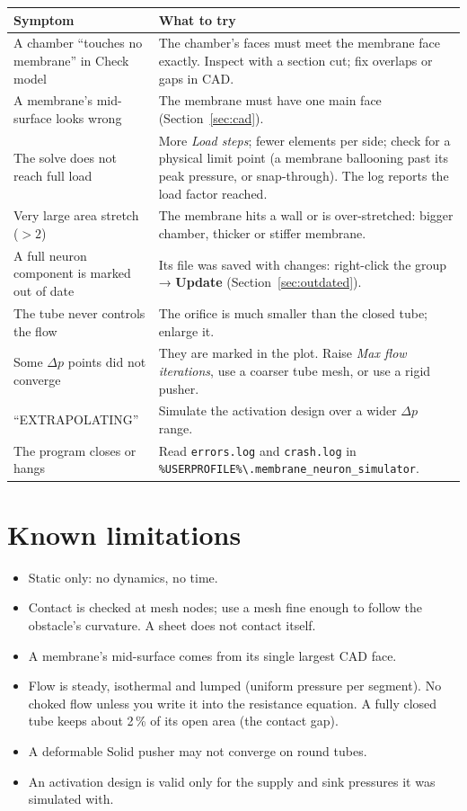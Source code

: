 \documentclass[11pt,a4paper]{article}
\newcommand{\code}[1]{\texttt{#1}}
\newcommand{\menu}[1]{\textsf{\textbf{#1}}}
\begin{document}
\begin{center}
\begin{tabularx}{\textwidth}{@{}>{\raggedright}p{} X@{}}
\toprule
Symptom & What to try \\
\midrule
A chamber ``touches no membrane'' in Check model & The chamber's faces must meet the membrane face exactly.
  Inspect with a section cut; fix overlaps or gaps in CAD. \\
A membrane's mid-surface looks wrong & The membrane must have one main face (Section~\ref{sec:cad}). \\
The solve does not reach full load & More \emph{Load steps}; fewer elements per side; check for a physical limit
  point (a membrane ballooning past its peak pressure, or snap-through). The log reports the load factor reached. \\
Very large area stretch ($>2$) & The membrane hits a wall or is over-stretched: bigger chamber, thicker or stiffer
  membrane. \\
A full neuron component is marked out of date & Its file was saved with changes: right-click the group →
  \menu{Update} (Section~\ref{sec:outdated}). \\
The tube never controls the flow & The orifice is much smaller than the closed tube; enlarge it. \\
Some $\Delta p$ points did not converge & They are marked in the plot. Raise \emph{Max flow iterations}, use a
  coarser tube mesh, or use a rigid pusher. \\
``EXTRAPOLATING'' & Simulate the activation design over a wider $\Delta p$ range. \\
The program closes or hangs & Read \code{errors.log} and \code{crash.log} in
  \code{\%USERPROFILE\%\textbackslash.membrane\_neuron\_simulator}. \\
\bottomrule
\end{tabularx}
\end{center}

\section{Known limitations}

\begin{itemize}
\item Static only: no dynamics, no time.
\item Contact is checked at mesh nodes; use a mesh fine enough to follow the obstacle's curvature. A sheet does not
  contact itself.
\item A membrane's mid-surface comes from its single largest CAD face.
\item Flow is steady, isothermal and lumped (uniform pressure per segment). No choked flow unless you write it into
  the resistance equation. A fully closed tube keeps about 2\,\% of its open area (the contact gap).
\item A deformable Solid pusher may not converge on round tubes.
\item An activation design is valid only for the supply and sink pressures it was simulated with.
\end{itemize}
\end{document}
